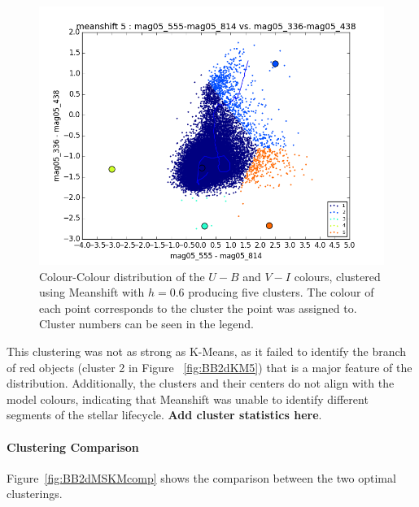 \begin{figure}[H]
\centering
\includegraphics[width=\linewidth]{figs/broad/meanshift_color_5cl_mag05_555-mag05_814vsmag05_336-mag05_438}
\caption{Colour-Colour distribution of the $U - B$ and $V - I$ colours, clustered using Meanshift with $h=0.6$ producing five clusters. The colour of each point corresponds to the cluster the point was assigned to. Cluster numbers can be seen in the legend.}
\label{fig:BB2dMS5}
\end{figure}

This clustering was not as strong as K-Means, as it failed to identify the branch of red objects (cluster 2 in Figure ~\ref{fig:BB2dKM5}) that is a major feature of the distribution.
Additionally, the clusters and their centers do not align with the model colours, indicating that Meanshift was unable to identify different segments of the stellar lifecycle.
\textbf{Add cluster statistics here}.

\paragraph{Clustering Comparison}
Figure~\ref{fig:BB2dMSKMcomp} shows the comparison between the two optimal clusterings.

